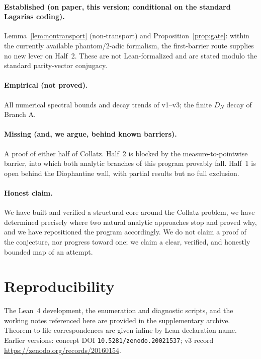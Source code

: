 \documentclass[11pt,a4paper]{article}
\theoremstyle{definition}
\begin{document}
\paragraph{Established (on paper, this version; conditional on the standard
Lagarias coding).}
Lemma~\ref{lem:nontransport} (non-transport) and
Proposition~\ref{prop:gate}: within the currently available phantom/$2$-adic
formalism, the first-barrier route supplies no new lever on Half~2. These
are not Lean-formalized and are stated modulo the standard parity-vector
conjugacy.

\paragraph{Empirical (not proved).}
All numerical spectral bounds and decay trends of v1--v3; the finite $D_N$
decay of Branch A.

\paragraph{Missing (and, we argue, behind known barriers).}
A proof of either half of Collatz. Half~2 is blocked by the
measure-to-pointwise barrier, into which both analytic branches of this
program provably fall. Half~1 is open behind the Diophantine wall, with
partial results but no full exclusion.

\paragraph{Honest claim.}
We have built and verified a structural core around the Collatz problem, we
have determined precisely where two natural analytic approaches stop and
proved why, and we have repositioned the program accordingly. We do not
claim a proof of the conjecture, nor progress toward one; we claim a clear,
verified, and honestly bounded map of an attempt.

\section*{Reproducibility}
The Lean~4 development, the enumeration and diagnostic scripts, and the
working notes referenced here are provided in the supplementary archive.
Theorem-to-file correspondences are given inline by Lean declaration name.
Earlier versions: concept DOI \texttt{10.5281/zenodo.20021537}; v3 record
\url{https://zenodo.org/records/20160154}.
\end{document}
